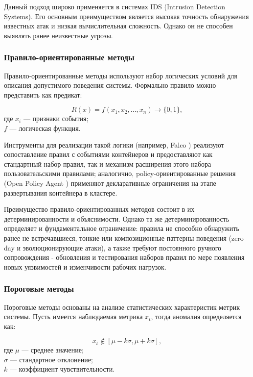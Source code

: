 Данный подход широко применяется в системах IDS (Intrusion Detection Systems). Его основным преимуществом является высокая точность обнаружения известных атак и низкая вычислительная сложность. Однако он не способен выявлять ранее неизвестные угрозы.

\subsubsection{Правило-ориентированные методы}

Правило-ориентированные методы используют набор логических условий для описания допустимого поведения системы. Формально правило можно представить как предикат:

$$
R(x) = f(x_1, x_2, ..., x_n) \rightarrow \{0,1\},
$$
где \(x_i\) — признаки события; \\ \(f\) — логическая функция.

Инструменты для реализации такой логики (например, Falco \cite{falco}) реализуют сопоставление правил с событиями контейнеров и предоставляют как стандартный набор правил, так и механизм расширения этого набора пользовательскими правилами; аналогично, policy-ориентированные решения (Open Policy Agent \cite{opa}) применяют декларативные ограничения на этапе развертывания контейнера в кластере.

Преимущество правило-ориентированных методов состоит в их детерминированности и объяснимости. Однако та же детерминированность определяет и фундаментальное ограничение: правила не способно обнаружить ранее не встречавшиеся, тонкие или композиционные паттерны поведения (zero-day и эволюционирующие атаки), а также требуют постоянного ручного сопровождения - обновления и тестирования наборов правил по мере появления новых уязвимостей и изменчивости рабочих нагрузок.

\subsubsection{Пороговые методы}

Пороговые методы основаны на анализе статистических характеристик метрик системы. Пусть имеется наблюдаемая метрика \(x_t\), тогда аномалия определяется как:

$$
x_t \notin [\mu - k\sigma, \mu + k\sigma],
$$
где \(\mu\) — среднее значение; \\ \(\sigma\) — стандартное отклонение; \\ \(k\) — коэффициент чувствительности.

